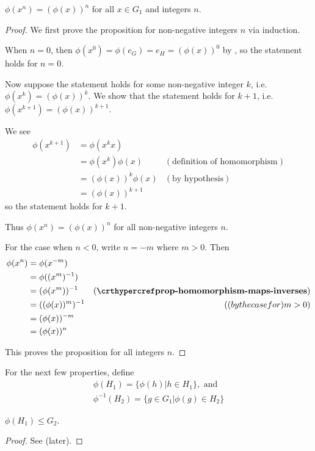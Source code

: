 \begin{proposition}
    $\phi(x^n) = (\phi(x))^n$ for all $x \in G_1$ and integers $n$.
\end{proposition}
\begin{proof}
    We first prove the proposition for non-negative integers $n$ via induction.

    When $n = 0$, then $\phi(x^0) = \phi(e_G) = e_H = (\phi(x))^0$ by , so the statement holds for $n = 0$.

    Now suppose the statement holds for some non-negative integer $k$, i.e. $\phi(x^k) = (\phi(x))^k$. We show that the statement holds for $k + 1$, i.e. $\phi(x^{k+1}) = (\phi(x))^{k+1}$.
    
    We see
    \begin{align*}
        \phi(x^{k+1}) &= \phi(x^kx) \\
        &= \phi(x^k)\phi(x) & (\text{definition of homomorphism})\\
        &= (\phi(x))^k\phi(x) & (\text{by hypothesis})\\
        &= (\phi(x))^{k+1}
    \end{align*}
    so the statement holds for $k+1$.

    Thus $\phi(x^n) = (\phi(x))^n$ for all non-negative integers $n$.

    For the case when $n < 0$, write $n = -m$ where $m > 0$. Then
    \begin{align*}
        \phi(x^n) &= \phi(x^{-m})\\
        &= \phi((x^m)^{-1})\\
        &= (\phi(x^m))^{-1} & (\myref{prop-homomorphism-maps-inverses})\\
        &= ((\phi(x))^m)^{-1} & (\text(by the case for )m>0)\\
        &= (\phi(x))^{-m}\\
        &= (\phi(x))^n
    \end{align*}

    This proves the proposition for all integers $n$.
\end{proof}

For the next few properties, define
\begin{gather*}
    \phi(H_1) = \{\phi(h) \vert h \in H_1\}, \text{ and}\\
    \phi^{-1}(H_2) = \{g \in G_1 \vert \phi(g) \in H_2\}
\end{gather*}

\begin{proposition}
    $\phi(H_1) \leq G_2$.
\end{proposition}
\begin{proof}
    See  (later).
\end{proof}

